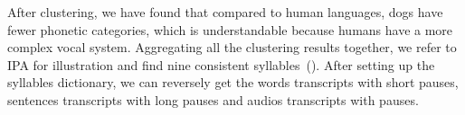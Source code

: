 











After clustering, we have found that compared to human languages, dogs have fewer phonetic categories, which is understandable because humans have a more complex vocal system. Aggregating all the clustering results together, we refer to IPA for illustration and find nine consistent syllables~(). After setting up the syllables dictionary, we can reversely get the words transcripts with short pauses, sentences transcripts with long pauses and audios transcripts with pauses.

